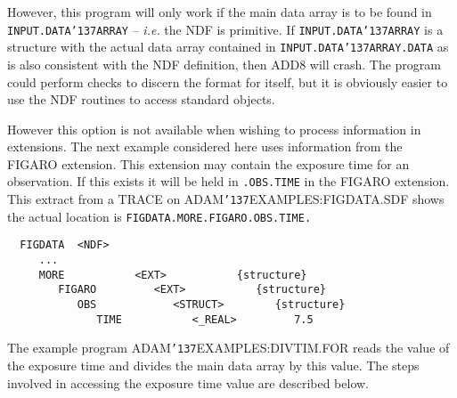 \documentclass[twoside,11pt]{article}
\renewcommand{\_}{{\tt\char'137}}
\begin{document}
However, this program will only work if the main data array is 
to be found in {\tt INPUT.DATA\_ARRAY} -- 
{\it i.e.} the NDF is primitive. If {\tt INPUT.DATA\_ARRAY} is a structure
with the actual data array contained in {\tt INPUT.DATA\_ARRAY.DATA} as is 
also consistent with the NDF definition, then ADD8 will crash.
The program could  perform checks to discern the format for itself, but
it is obviously easier to use the NDF routines to access standard objects.

However this option is not available when wishing to process information in 
extensions.
The next example considered here uses information from the FIGARO extension.
This  extension may contain the exposure time for an observation.
If this exists it will be held in {\tt.OBS.TIME} in the FIGARO extension.
This extract from a TRACE on ADAM\_EXAMPLES:FIGDATA.SDF shows the actual
location is {\tt FIGDATA.MORE.FIGARO.OBS.TIME.}
\begin{verbatim}
  FIGDATA  <NDF>
     ...
     MORE           <EXT>           {structure}
        FIGARO         <EXT>           {structure}
           OBS            <STRUCT>        {structure}
              TIME           <_REAL>         7.5
\end{verbatim}
The example program ADAM\_EXAMPLES:DIVTIM.FOR reads the value of the
exposure time and divides the main data array by this value. 
The steps involved in accessing the exposure time value are described 
below.
\end{document}
